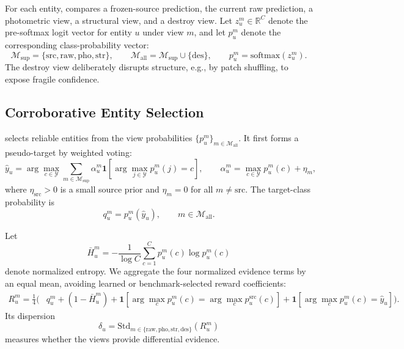 For each entity, \method{} compares a frozen-source prediction, the current raw
prediction, a photometric view, a structural view, and a destroy view. Let
$z_u^m\in\mathbb{R}^{C}$ denote the pre-softmax logit vector for entity $u$
under view $m$, and let $p_u^m$ denote the corresponding class-probability
vector:
\begin{equation}
\mathcal{M}_{\mathrm{sup}}
=
\{\mathrm{src},\mathrm{raw},\mathrm{pho},\mathrm{str}\},
\qquad
\mathcal{M}_{\mathrm{all}}
=
\mathcal{M}_{\mathrm{sup}}\cup\{\mathrm{des}\},
\qquad
p_u^m=\mathrm{softmax}(z_u^m).
\label{eq:view_prob}
\end{equation}
The destroy view deliberately disrupts structure, e.g., by patch shuffling, to expose fragile confidence.


\subsection{Corroborative Entity Selection}

\core{} selects reliable entities from the view probabilities
$\{p_u^m\}_{m\in\mathcal{M}_{\mathrm{all}}}$. It first forms a pseudo-target by weighted voting:
\begin{equation}
\hat y_u
=
\arg\max_{c\in\mathcal{Y}}
\sum_{m\in\mathcal{M}_{\mathrm{sup}}}
\alpha_u^m
\mathbf{1}\!\left[
\arg\max_{j\in\mathcal{Y}}p_u^m(j)=c
\right],
\qquad
\alpha_u^m=\max_{c\in\mathcal{Y}}p_u^m(c)+\eta_m ,
\label{eq:vote}
\end{equation}
where $\eta_{\mathrm{src}}>0$ is a small source prior and $\eta_m=0$ for all $m\neq \mathrm{src}$.
The target-class probability is
\begin{equation}
q_u^m=p_u^m(\hat y_u),
\qquad
m\in\mathcal{M}_{\mathrm{all}}.
\label{eq:target_prob}
\end{equation}

Let
\begin{equation}
\bar H_u^m
=
-\frac{1}{\log C}
\sum_{c=1}^{C}p_u^m(c)\log p_u^m(c)
\label{eq:normalized_entropy}
\end{equation}
denote normalized entropy. We aggregate the four normalized evidence terms by
an equal mean, avoiding learned or benchmark-selected reward coefficients:
\begin{equation}
\begin{aligned}
R_u^m
=\frac{1}{4}\Big(&q_u^m+(1-\bar H_u^m)
+
\mathbf{1}\!\left[
\arg\max_c p_u^m(c)=\arg\max_c p_u^{\mathrm{src}}(c)
\right]
+
\mathbf{1}\!\left[
\arg\max_c p_u^m(c)=\hat y_u
\right]\Big).
\end{aligned}
\label{eq:reward}
\end{equation}
Its dispersion
\begin{equation}
\delta_u
=
\mathrm{Std}_{m\in\{\mathrm{raw},\mathrm{pho},\mathrm{str},\mathrm{des}\}}
(R_u^m)
\label{eq:dispersion}
\end{equation}
measures whether the views provide differential evidence.

